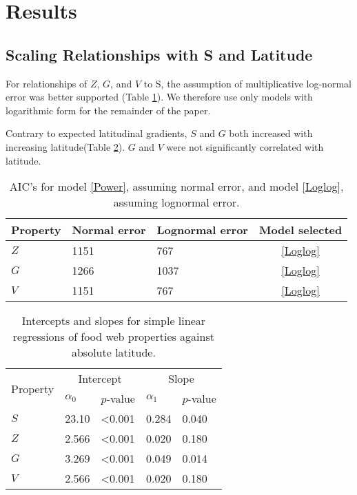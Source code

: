 \documentclass[12pt]{article}
\begin{document}
\section*{Results}

\subsection*{Scaling Relationships with S and Latitude}

For relationships of $Z$, $G$, and $V$ to S, the assumption of multiplicative log-normal error was better supported
(Table \ref{Errorfits}). We therefore use only models with logarithmic form for the remainder of the paper.


Contrary to expected latitudinal gradients, $S$ and $G$ both increased with increasing latitude(Table \ref{Latlms}). 
$G$ and $V$ were not significantly correlated with latitude. 

\begin{table}[!t]

\caption{AIC's for model \ref{Power}, assuming normal error, and model \ref{Loglog}, assuming lognormal error.}
\label{Errorfits}
\begin{tabular}{l | l l | c}
Property & Normal error & Lognormal error & Model selected \\
\hline
$Z$ & 1151 &  767 & \ref{Loglog} \\
$G$ & 1266 & 1037 & \ref{Loglog} \\
$V$ & 1151 & 767 & \ref{Loglog} \\
\end{tabular}
\end{table}


\begin{table}[!h]
\caption{Intercepts and slopes for simple linear regressions of food web properties against absolute latitude.}
\label{Latlms}
\begin{tabular}{l | l l | l l}

\multirow{2}{*}{Property} & \multicolumn{2}{|c}{Intercept} & \multicolumn{2}{|c}{Slope} \\
                      & $\alpha_{0}$ & $p$-value & $\alpha_{1}$ & $p$-value \\
\hline
$S$ & 23.10 & \textless0.001 & 0.284 & 0.040 \\
$Z$ & 2.566 & \textless0.001 & 0.020 & 0.180 \\
$G$ & 3.269 & \textless0.001 & 0.049 & 0.014 \\
$V$ & 2.566 & \textless0.001 & 0.020 & 0.180 \\
\end{tabular}
\end{table}
\end{document}
